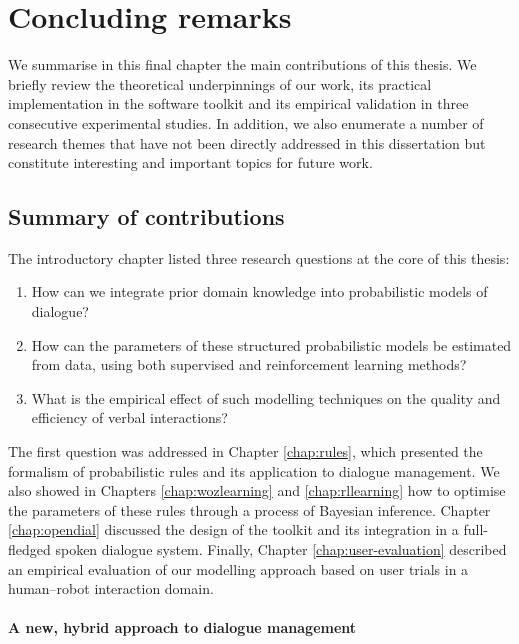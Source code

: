 \chapter{Concluding remarks}
\label{chap:conclusions}

We summarise in this final chapter the main contributions of this thesis.  We briefly review the theoretical underpinnings of our work, its practical implementation in the \opendial{} software toolkit and its empirical validation in three consecutive experimental studies.  In addition, we also enumerate a number of research themes that have not been directly addressed in this dissertation but constitute interesting and important topics for future work. 

\section{Summary of contributions}

The introductory chapter listed three research questions at the core of this thesis:
\begin{enumerate}
\item How can we integrate prior domain knowledge into probabilistic models of dialogue?
\item How can the parameters of these structured probabilistic models be estimated from data, using both supervised and reinforcement learning methods?  
\item What is the empirical effect of such modelling techniques on the quality and efficiency of verbal interactions?
\end{enumerate}

The first question was addressed in Chapter \ref{chap:rules}, which presented the formalism of probabilistic rules and its application to dialogue management.  We also showed in Chapters \ref{chap:wozlearning} and \ref{chap:rllearning} how to optimise the parameters of these rules through a process of Bayesian inference.  Chapter \ref{chap:opendial} discussed the design of the \opendial{} toolkit and its integration in a full-fledged spoken dialogue system. Finally, Chapter \ref{chap:user-evaluation} described an empirical evaluation of our modelling approach based on user trials in a human--robot interaction domain.

\subsubsection*{A new, hybrid approach to dialogue management}

